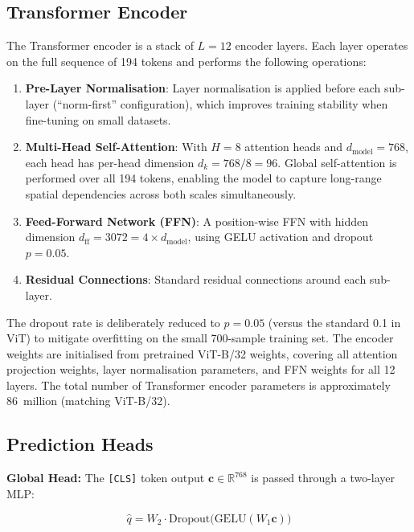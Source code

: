 \subsection{Transformer Encoder}

The Transformer encoder is a stack of $L = 12$ encoder layers. Each layer operates on
the full sequence of 194 tokens and performs the following operations:

\begin{enumerate}
    \item \textbf{Pre-Layer Normalisation}: Layer normalisation is applied before each
          sub-layer (``norm-first'' configuration), which improves training stability
          when fine-tuning on small datasets.
    \item \textbf{Multi-Head Self-Attention}: With $H = 8$ attention heads and
          $d_{\text{model}} = 768$, each head has per-head dimension
          $d_k = 768 / 8 = 96$. Global self-attention is performed over all 194 tokens,
          enabling the model to capture long-range spatial dependencies across both
          scales simultaneously.
    \item \textbf{Feed-Forward Network (FFN)}: A position-wise FFN with hidden dimension
          $d_{\text{ff}} = 3072 = 4 \times d_{\text{model}}$, using GELU activation and
          dropout $p = 0.05$.
    \item \textbf{Residual Connections}: Standard residual connections around each
          sub-layer.
\end{enumerate}

The dropout rate is deliberately reduced to $p = 0.05$ (versus the standard 0.1 in ViT)
to mitigate overfitting on the small 700-sample training set. The encoder weights are
initialised from pretrained ViT-B/32 weights, covering all attention projection weights,
layer normalisation parameters, and FFN weights for all 12 layers. The total number of
Transformer encoder parameters is approximately 86~million (matching ViT-B/32).

\subsection{Prediction Heads}

\textbf{Global Head:} The \texttt{[CLS]} token output
$\mathbf{c} \in \mathbb{R}^{768}$ is passed through a two-layer MLP:

\begin{equation}
    \hat{q} = W_2 \cdot \text{Dropout}\bigl(\text{GELU}(W_1 \mathbf{c})\bigr)
\end{equation}

